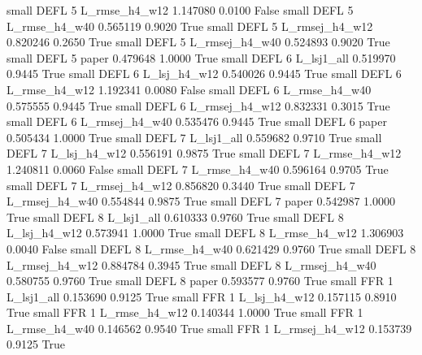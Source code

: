      small     DEFL                 5  L_rmse_h4_w12   1.147080      0.0100   False
     small     DEFL                 5  L_rmse_h4_w40   0.565119      0.9020    True
     small     DEFL                 5 L_rmsej_h4_w12   0.820246      0.2650    True
     small     DEFL                 5 L_rmsej_h4_w40   0.524893      0.9020    True
     small     DEFL                 5          paper   0.479648      1.0000    True
     small     DEFL                 6     L_lsj1_all   0.519970      0.9445    True
     small     DEFL                 6   L_lsj_h4_w12   0.540026      0.9445    True
     small     DEFL                 6  L_rmse_h4_w12   1.192341      0.0080   False
     small     DEFL                 6  L_rmse_h4_w40   0.575555      0.9445    True
     small     DEFL                 6 L_rmsej_h4_w12   0.832331      0.3015    True
     small     DEFL                 6 L_rmsej_h4_w40   0.535476      0.9445    True
     small     DEFL                 6          paper   0.505434      1.0000    True
     small     DEFL                 7     L_lsj1_all   0.559682      0.9710    True
     small     DEFL                 7   L_lsj_h4_w12   0.556191      0.9875    True
     small     DEFL                 7  L_rmse_h4_w12   1.240811      0.0060   False
     small     DEFL                 7  L_rmse_h4_w40   0.596164      0.9705    True
     small     DEFL                 7 L_rmsej_h4_w12   0.856820      0.3440    True
     small     DEFL                 7 L_rmsej_h4_w40   0.554844      0.9875    True
     small     DEFL                 7          paper   0.542987      1.0000    True
     small     DEFL                 8     L_lsj1_all   0.610333      0.9760    True
     small     DEFL                 8   L_lsj_h4_w12   0.573941      1.0000    True
     small     DEFL                 8  L_rmse_h4_w12   1.306903      0.0040   False
     small     DEFL                 8  L_rmse_h4_w40   0.621429      0.9760    True
     small     DEFL                 8 L_rmsej_h4_w12   0.884784      0.3945    True
     small     DEFL                 8 L_rmsej_h4_w40   0.580755      0.9760    True
     small     DEFL                 8          paper   0.593577      0.9760    True
     small      FFR                 1     L_lsj1_all   0.153690      0.9125    True
     small      FFR                 1   L_lsj_h4_w12   0.157115      0.8910    True
     small      FFR                 1  L_rmse_h4_w12   0.140344      1.0000    True
     small      FFR                 1  L_rmse_h4_w40   0.146562      0.9540    True
     small      FFR                 1 L_rmsej_h4_w12   0.153739      0.9125    True
